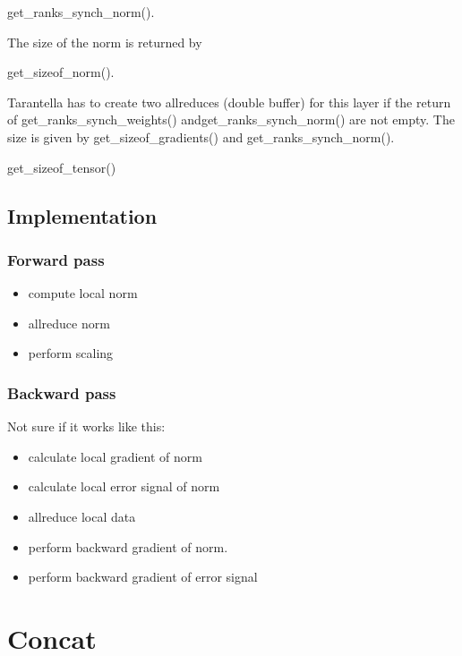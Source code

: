 \documentclass{report}
\begin{document}
get\_ranks\_synch\_norm().

The size of the norm is returned by

get\_sizeof\_norm().

Tarantella has to create two allreduces (double buffer) for this layer if the
return of get\_ranks\_synch\_weights() andget\_ranks\_synch\_norm()
are not empty. The size is
given by get\_sizeof\_gradients() and get\_ranks\_synch\_norm().

get\_sizeof\_tensor()

\section{Implementation}

\subsection{Forward pass}
\begin{itemize}
\item
  compute local norm
\item
  allreduce norm
\item
  perform scaling
\end{itemize}


\subsection{Backward pass}
Not sure if it works like this:

\begin{itemize}
\item
  calculate local gradient of norm
\item
  calculate local error signal of norm
\item
  allreduce local data
\item
  perform backward gradient of norm.
\item
  perform backward gradient of error signal
\end{itemize}

\chapter{Concat}
\end{document}
